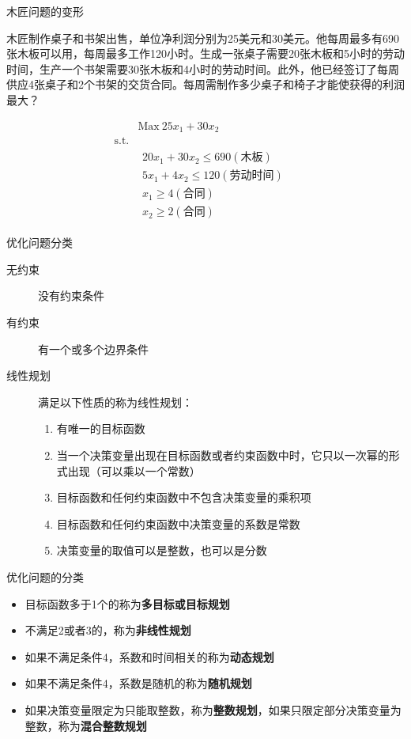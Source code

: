 \documentclass[mathserif, table]{beamer}
\begin{document}
\begin{frame}{木匠问题的变形}
  \begin{block}{}
木匠制作桌子和书架出售，单位净利润分别为25美元和30美元。他每周最多有690张木板可以用，每周最多工作120小时。生成一张桌子需要20张木板和5小时的劳动时间，生产一个书架需要30张木板和4小时的劳动时间。此外，他已经签订了每周供应4张桌子和2个书架的交货合同。每周需制作多少桌子和椅子才能使获得的利润最大？
  \end{block}

    \[ 
    \begin{array}{lcl}
      & \mbox{Max}\ 25x_1 + 30x_2 & \\
      \mbox{s.t.} & &  \\
      &
        \begin{array}{c}
          20x_1 + 30x_2 \le 690 (\text{木板})\\
          5x_1 + 4x_2 \le 120 (\text{劳动时间})\\
          x_1 \ge 4 (\text{合同})\\
          x_2 \ge 2 (\text{合同})
        \end{array}
        &
    \end{array}
    \]
  
\end{frame}

\begin{frame}{优化问题分类}
  \begin{description}
  \item[无约束] 没有约束条件
  \item[有约束] 有一个或多个边界条件
  \item[线性规划] 满足以下性质的称为线性规划：
    \begin{enumerate}
    \item 有唯一的目标函数
    \item 当一个决策变量出现在目标函数或者约束函数中时，它只以一次幂的形式出现（可以乘以一个常数）
    \item 目标函数和任何约束函数中不包含决策变量的乘积项
    \item 目标函数和任何约束函数中决策变量的系数是常数
    \item 决策变量的取值可以是整数，也可以是分数
    \end{enumerate}
  \end{description}
  
\end{frame}

\begin{frame}{优化问题的分类}
  \begin{itemize}
  \item 目标函数多于1个的称为\textbf{多目标或目标规划}
  \item 不满足2或者3的，称为\textbf{非线性规划}
  \item 如果不满足条件4，系数和时间相关的称为\textbf{动态规划}
  \item 如果不满足条件4，系数是随机的称为\textbf{随机规划}
  \item 如果决策变量限定为只能取整数，称为\textbf{整数规划}，如果只限定部分决策变量为整数，称为\textbf{混合整数规划}
  \end{itemize}
\end{frame}
\end{document}
